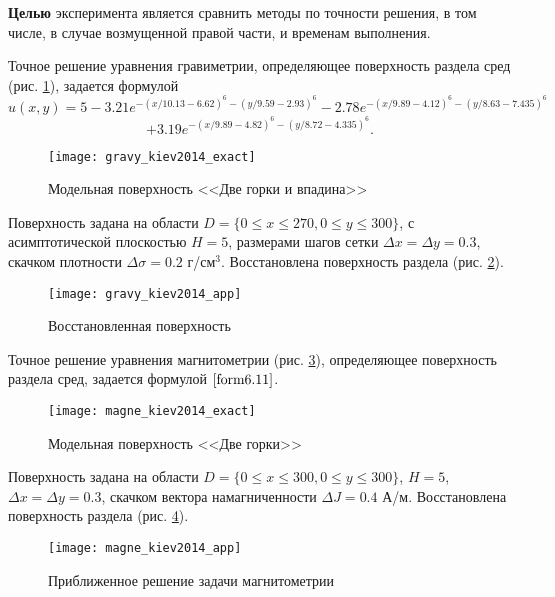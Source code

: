 {\bfseries Целью} эксперимента является сравнить методы по точности решения, в том числе, в случае возмущенной правой части, и временам выполнения. 

Точное решение уравнения гравиметрии, определяющее поверхность раздела сред (рис. \ref{fig:gravy_kiev2014_exact}), задается формулой
$$\hat{u}(x,y)=5-3.21e^{-(x/10.13-6.62)^6-(y/9.59-2.93)^6}-2.78e^{-(x/9.89-4.12)^6-(y/8.63-7.435)^6}$$ 
\begin{equation}\label{exact_exp3.4.1}
+3.19e^{-(x/9.89-4.82)^6-(y/8.72-4.335)^6}.
\end{equation}
\begin{figure}[h]
	\centering
	\texttt{[image: gravy\_kiev2014\_exact]}
	\caption{Модельная поверхность <<Две горки и впадина>>}
	\label{fig:gravy_kiev2014_exact}
\end{figure}
Поверхность задана на области $D=\{0\le x\le 270, 0\le y\le 300\}$, с асимптотической плоскостью $H=5$, размерами шагов сетки $\Delta x=\Delta y=0.3$, скачком плотности $\Delta\sigma=0.2$ г/см$^3$. Восстановлена поверхность раздела (рис. \ref{fig:gravy_kiev2014_app}).
\begin{figure}[h]
	\centering
	\texttt{[image: gravy\_kiev2014\_app]}
	\caption{Восстановленная поверхность}
	\label{fig:gravy_kiev2014_app}
\end{figure}

Точное решение уравнения магнитометрии (рис. \ref{fig:magne_kiev2014_exact}), определяющее поверхность раздела сред, задается формулой $\eqref{form6.11}$.
\begin{figure}[H]
	\centering
	\texttt{[image: magne\_kiev2014\_exact]}
	\caption{Модельная поверхность <<Две горки>>}
	\label{fig:magne_kiev2014_exact}
\end{figure}
Поверхность задана на области $D=\{0\le x\le 300, 0\le y\le 300\}$, $H=5$, $\Delta x=\Delta y=0.3$, скачком вектора намагниченности $\Delta J=0.4$ А/м. Восстановлена поверхность раздела (рис. \ref{fig:magne_kiev2014_app}). 
\begin{figure}[H]
	\centering
	\texttt{[image: magne\_kiev2014\_app]}
	\caption{Приближенное решение задачи магнитометрии}
	\label{fig:magne_kiev2014_app}
\end{figure}

